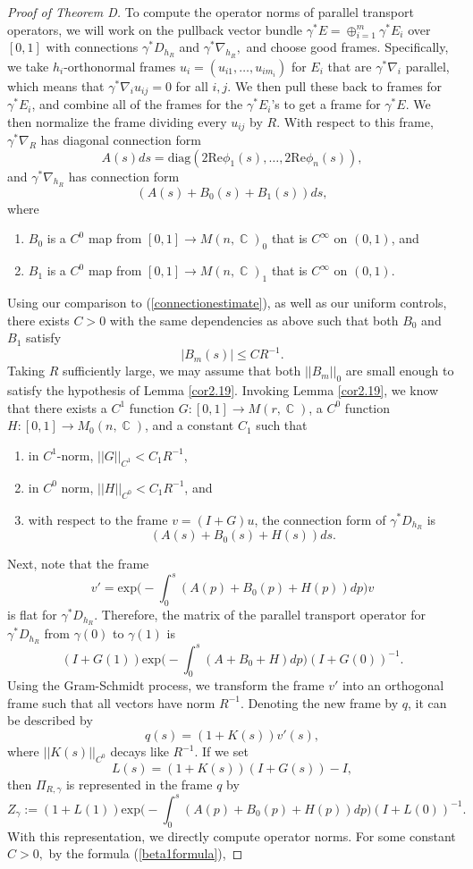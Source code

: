 \documentclass[10pt]{amsart}
\theoremstyle{definition}
\DeclareMathOperator{\C}{\mathbb{C}}
\begin{document}
\begin{proof}[Proof of Theorem D]
To compute the operator norms of parallel transport operators, we will work on the pullback vector bundle $\gamma^*E=\oplus_{i=1}^m\gamma^*E_i$ over $[0,1]$ with connections $\gamma^*D_{h_R}$ and $\gamma^*\nabla_{h_R},$ and choose good frames. Specifically, we take $h_i$-orthonormal frames $u_i=(u_{i1},\dots, u_{im_i})$ for $E_i$ that are $\gamma^*\nabla_i$ parallel, which means that $\gamma^*\nabla_i u_{ij}=0$ for all $i,j$. We then pull these back to frames for $\gamma^*E_i$, and combine all of the frames for the $\gamma^*E_i$'s to get a frame for $\gamma^*E$. We then normalize the frame dividing every $u_{ij}$ by $R$. With respect to this frame, $\gamma^*\nabla_R$ has diagonal connection form $$A(s)ds = \textrm{diag}(2\textrm{Re}\phi_1(s),\dots, 2\textrm{Re}\phi_n(s)),$$ and $\gamma^*\nabla_{h_R}$ has connection form $$(A(s)+B_0(s)+B_1(s))ds,$$ where 
\begin{enumerate}
\item $B_0$ is a $C^0$ map from $[0,1]\to M(n,\C)_0$ that is $C^\infty$ on $(0,1)$, and
\item $B_1$ is a $C^0$ map from $[0,1]\to M(n,\C)_1$ that is $C^\infty$ on $(0,1)$. 
\end{enumerate}
Using our comparison to (\ref{connectionestimate}), as well as our uniform controls, there exists $C>0$ with the same dependencies as above such that both $B_0$ and $B_1$ satisfy $$|B_m(s)|\leq CR^{-1}.$$ Taking $R$ sufficiently large, we may assume that both $||B_m||_0$  are small enough to satisfy the hypothesis of Lemma \ref{cor2.19}. Invoking Lemma \ref{cor2.19}, we know that there exists a $C^1$ function $G:[0,1]\to M(r,\C)$, a $C^0$ function $H:[0,1]\to M_0(n,\C)$, and a constant $C_1$ such that 
\begin{enumerate}
\item in $C^1$-norm, $||G||_{C^1}<C_1R^{-1}$,
\item in $C^0$ norm, $||H||_{C^0}<C_1R^{-1}$, and
\item with respect to the frame $v=(I+G)u$, the connection form of $\gamma^*D_{h_R}$ is $$(A(s)+B_0(s)+H(s))ds.$$
\end{enumerate}
Next, note that the frame $$v'=\textrm{exp}\Big (-\int_0^s(A(p)+B_0(p)+H(p))dp\Big )v$$ is flat for $\gamma^*D_{h_R}$. Therefore, the matrix of the parallel transport operator for $\gamma^*D_{h_R}$ from $\gamma(0)$ to $\gamma(1)$ is $$(I+G(1))\textrm{exp}\Big (-\int_0^s(A+B_0+H)dp\Big )(I+G(0))^{-1}.$$ Using the Gram-Schmidt process, we transform the frame $v'$ into an orthogonal frame such that all vectors have norm $R^{-1}.$ Denoting the new frame by $q$, it can be described by $$q(s)=(1+K(s))v'(s),$$ where $||K(s)||_{C^0}$ decays like $R^{-1}.$ If we set $$L(s)=(1+K(s))(I+G(s))-I,$$ then $\Pi_{R,\gamma}$ is represented in the frame $q$ by $$Z_{\gamma}:=(1+L(1))\textrm{exp}\Big (-\int_0^s(A(p)+B_0(p)+H(p))dp\Big )(I+L(0))^{-1}.$$ With this representation, we directly compute operator norms. For some constant $C>0,$ by the formula (\ref{beta1formula}),

\end{proof}
\end{document}
